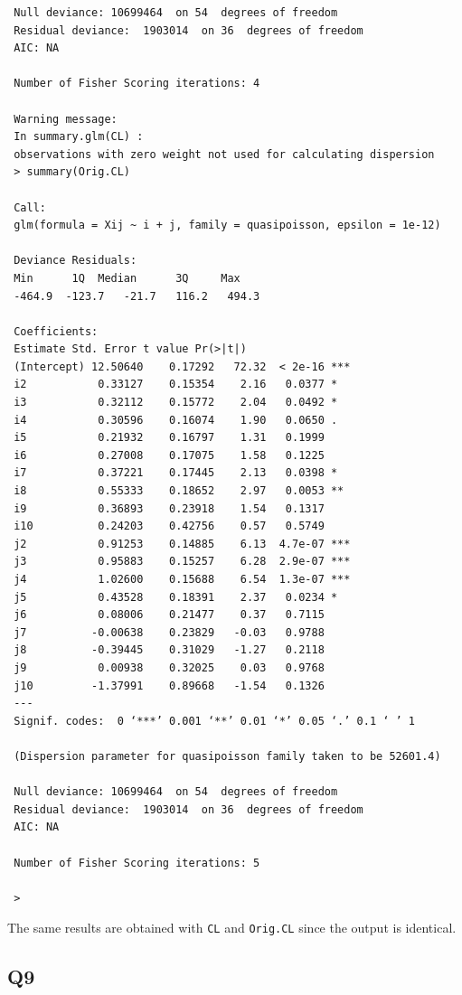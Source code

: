 \documentclass[11pt]{article}
\begin{document}
\begin{verbatim}
 Null deviance: 10699464  on 54  degrees of freedom
 Residual deviance:  1903014  on 36  degrees of freedom
 AIC: NA
 
 Number of Fisher Scoring iterations: 4
 
 Warning message:
 In summary.glm(CL) :
 observations with zero weight not used for calculating dispersion
 > summary(Orig.CL)
 
 Call:
 glm(formula = Xij ~ i + j, family = quasipoisson, epsilon = 1e-12)
 
 Deviance Residuals: 
 Min      1Q  Median      3Q     Max  
 -464.9  -123.7   -21.7   116.2   494.3  
 
 Coefficients:
 Estimate Std. Error t value Pr(>|t|)    
 (Intercept) 12.50640    0.17292   72.32  < 2e-16 ***
 i2           0.33127    0.15354    2.16   0.0377 *  
 i3           0.32112    0.15772    2.04   0.0492 *  
 i4           0.30596    0.16074    1.90   0.0650 .  
 i5           0.21932    0.16797    1.31   0.1999    
 i6           0.27008    0.17075    1.58   0.1225    
 i7           0.37221    0.17445    2.13   0.0398 *  
 i8           0.55333    0.18652    2.97   0.0053 ** 
 i9           0.36893    0.23918    1.54   0.1317    
 i10          0.24203    0.42756    0.57   0.5749    
 j2           0.91253    0.14885    6.13  4.7e-07 ***
 j3           0.95883    0.15257    6.28  2.9e-07 ***
 j4           1.02600    0.15688    6.54  1.3e-07 ***
 j5           0.43528    0.18391    2.37   0.0234 *  
 j6           0.08006    0.21477    0.37   0.7115    
 j7          -0.00638    0.23829   -0.03   0.9788    
 j8          -0.39445    0.31029   -1.27   0.2118    
 j9           0.00938    0.32025    0.03   0.9768    
 j10         -1.37991    0.89668   -1.54   0.1326    
 ---
 Signif. codes:  0 ‘***’ 0.001 ‘**’ 0.01 ‘*’ 0.05 ‘.’ 0.1 ‘ ’ 1
 
 (Dispersion parameter for quasipoisson family taken to be 52601.4)
 
 Null deviance: 10699464  on 54  degrees of freedom
 Residual deviance:  1903014  on 36  degrees of freedom
 AIC: NA
 
 Number of Fisher Scoring iterations: 5
 
 >
\end{verbatim}

The same results are obtained with \verb|CL| and \verb|Orig.CL| since the output is identical.

\subsection*{Q9}
\end{document}
